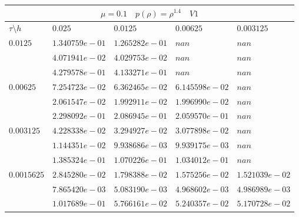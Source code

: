\documentclass[a4paper,12pt]{extarticle}
\begin{document}
\begin{tabular}{|l|l|l|l|l|}
	\hline
	\multicolumn{5}{|c|}{$\mu =0.1 \quad  p(\rho) = \rho^{1.4} \quad V1$}\\
	\hline
	$\tau\setminus h$ & $0.025$ & $0.0125$ & $0.00625$ & $0.003125$\\
	\hline
	$0.0125$  & $1.340759e-01$ & $1.265282e-01$ & $nan$ & $nan$\\
	& $4.071941e-02$ & $4.029753e-02$ & $nan$ & $nan$\\
	& $4.279578e-01$ & $4.133271e-01$ & $nan$ & $nan$\\
	\hline
	$0.00625$  & $7.254723e-02$ & $6.362465e-02$ & $6.145598e-02$ & $nan$\\
	& $2.061547e-02$ & $1.992911e-02$ & $1.996990e-02$ & $nan$\\
	& $2.298092e-01$ & $2.086945e-01$ & $2.059570e-01$ & $nan$\\
	\hline
	$0.003125$  & $4.228338e-02$ & $3.294927e-02$ & $3.077898e-02$ & $nan$\\
	& $1.144351e-02$ & $9.938686e-03$ & $9.939175e-03$ & $nan$\\
	& $1.385324e-01$ & $1.070226e-01$ & $1.034012e-01$ & $nan$\\
	\hline
	$0.0015625$  & $2.845280e-02$ & $1.798388e-02$ & $1.575256e-02$ & $1.521039e-02$\\
	& $7.865420e-03$ & $5.083190e-03$ & $4.968602e-03$ & $4.986989e-03$\\
	& $1.017689e-01$ & $5.766161e-02$ & $5.240357e-02$ & $5.170728e-02$\\
	\hline
\end{tabular}
\end{document}
